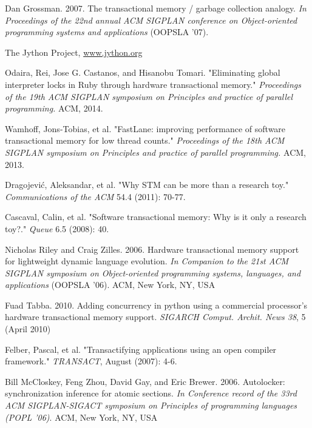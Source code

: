 \documentclass{sigplanconf}
\begin{document}
\begin{thebibliography}{}
\softraggedright

  Dan Grossman. 2007. The transactional memory / garbage collection
  analogy. \emph{In Proceedings of the 22nd annual ACM SIGPLAN
    conference on Object-oriented programming systems and
    applications} (OOPSLA '07).

  The Jython Project, \url{www.jython.org}

  Odaira, Rei, Jose G. Castanos, and Hisanobu Tomari.  "Eliminating
  global interpreter locks in Ruby through hardware transactional
  memory."  \emph{Proceedings of the 19th ACM SIGPLAN symposium on
    Principles and practice of parallel programming.} ACM, 2014.

  Wamhoff, Jons-Tobias, et al. "FastLane: improving performance of
  software transactional memory for low thread counts."
  \emph{Proceedings of the 18th ACM SIGPLAN symposium on Principles
    and practice of parallel programming.} ACM, 2013.

  Dragojević, Aleksandar, et al. "Why STM can be more than a research
  toy." \emph{Communications of the ACM} 54.4 (2011): 70-77.

  Cascaval, Calin, et al. "Software transactional memory: Why is it
  only a research toy?." \emph{Queue} 6.5 (2008): 40.

  Nicholas Riley and Craig Zilles. 2006. Hardware transactional memory
  support for lightweight dynamic language evolution. \emph{In
    Companion to the 21st ACM SIGPLAN symposium on Object-oriented
    programming systems, languages, and applications} (OOPSLA
  '06). ACM, New York, NY, USA

  Fuad Tabba. 2010. Adding concurrency in python using a commercial
  processor's hardware transactional memory support. \emph{SIGARCH
  Comput. Archit. News 38}, 5 (April 2010)

  Felber, Pascal, et al. "Transactifying applications using an open
  compiler framework." \emph{TRANSACT}, August (2007): 4-6.

  Bill McCloskey, Feng Zhou, David Gay, and Eric
  Brewer. 2006. Autolocker: synchronization inference for atomic
  sections. \emph{In Conference record of the 33rd ACM SIGPLAN-SIGACT
  symposium on Principles of programming languages (POPL '06)}. ACM,
  New York, NY, USA


\end{thebibliography}
\end{document}
